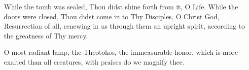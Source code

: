 \documentclass[twoside, letterpaper, 12pt]{report}
\begin{document}
While the tomb was sealed, Thou didst shine forth from it, O Life. While the doors were closed,
Thou didst come in to Thy Disciples, O Christ God, Resurrection of all, renewing in us through
them an upright spirit, according to the greatness of Thy mercy.

O most radiant lamp, the Theotokos, the immeasurable honor, which is more exalted than all
creatures, with praises do we magnify thee.

\vspace{1cm}

\readerline{\throughtheprayers}

\end{document}
